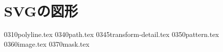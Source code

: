 \chapter{SVGの図形}
 \CH 0310polyline.tex
 \CH 0340path.tex
\ifSeminor
\else
 \CH 0345transform-detail.tex
\fi
 \CH 0350pattern.tex
\ifSeminor
\else
 \CH 0360image.tex
\fi
\ifSeminor
\else
 \CH 0370mask.tex
\fi
